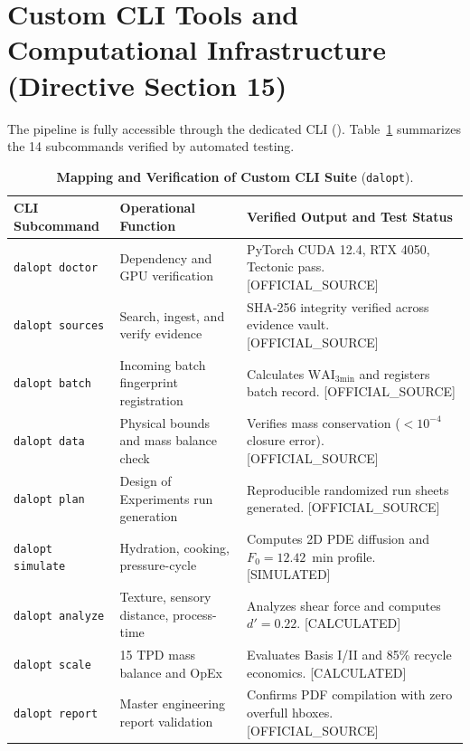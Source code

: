 \documentclass[10pt,a4paper]{article}
\newcommand{\epistag}[1]{\textsf{\scriptsize\textcolor{fnqslate}{[#1]}}}
\begin{document}
\section{Custom CLI Tools and Computational Infrastructure (Directive Section 15)}
The pipeline is fully accessible through the dedicated CLI (). Table~\ref{tab:cli_mapping} summarizes the 14 subcommands verified by automated testing.

\begin{table}[H]
\centering
\footnotesize
\setlength{\tabcolsep}{3.0pt}
\caption{\textbf{Mapping and Verification of Custom CLI Suite} (\texttt{dalopt}).}
\label{tab:cli_mapping}
\begin{tabularx}{\linewidth}{p{3.0cm}p{4.5cm}>{\raggedright\arraybackslash}X}
\toprule
\textbf{CLI Subcommand} & \textbf{Operational Function} & \textbf{Verified Output and Test Status} \\
\midrule
\texttt{dalopt doctor} & Dependency and GPU verification & PyTorch CUDA 12.4, RTX 4050, Tectonic pass. \epistag{OFFICIAL\_SOURCE} \\
\texttt{dalopt sources} & Search, ingest, and verify evidence & SHA-256 integrity verified across evidence vault. \epistag{OFFICIAL\_SOURCE} \\
\texttt{dalopt batch} & Incoming batch fingerprint registration & Calculates $\mathrm{WAI}_{\mathrm{3min}}$ and registers batch record. \epistag{OFFICIAL\_SOURCE} \\
\texttt{dalopt data} & Physical bounds and mass balance check & Verifies mass conservation ($< 10^{-4}$ closure error). \epistag{OFFICIAL\_SOURCE} \\
\texttt{dalopt plan} & Design of Experiments run generation & Reproducible randomized run sheets generated. \epistag{OFFICIAL\_SOURCE} \\
\texttt{dalopt simulate} & Hydration, cooking, pressure-cycle & Computes 2D PDE diffusion and $F_0 = 12.42$~min profile. \epistag{SIMULATED} \\
\texttt{dalopt analyze} & Texture, sensory distance, process-time & Analyzes shear force and computes $d' = 0.22$. \epistag{CALCULATED} \\
\texttt{dalopt scale} & 15 TPD mass balance and OpEx & Evaluates Basis I/II and 85\% recycle economics. \epistag{CALCULATED} \\
\texttt{dalopt report} & Master engineering report validation & Confirms PDF compilation with zero overfull hboxes. \epistag{OFFICIAL\_SOURCE} \\
\bottomrule
\end{tabularx}
\end{table}
\end{document}
